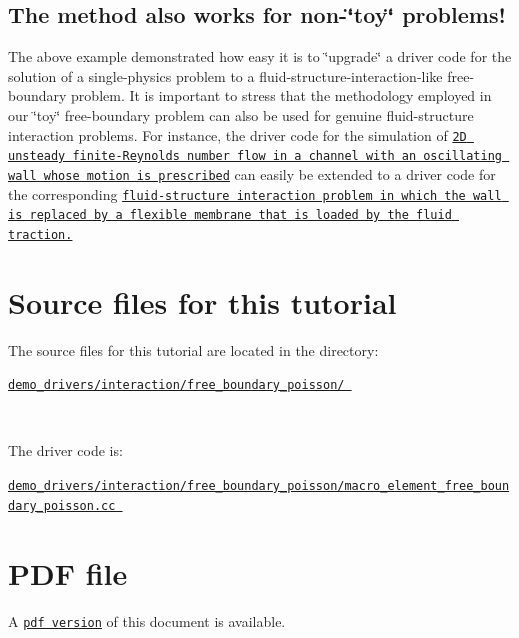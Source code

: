 \hypertarget{index_fsi}{}\subsection{The method also works for non-\/\char`\"{}toy\char`\"{} problems!}\label{index_fsi}
The above example demonstrated how easy it is to \char`\"{}upgrade\char`\"{} a driver code for the solution of a single-\/physics problem to a fluid-\/structure-\/interaction-\/like free-\/boundary problem. It is important to stress that the methodology employed in our \char`\"{}toy\char`\"{} free-\/boundary problem can also be used for genuine fluid-\/structure interaction problems. For instance, the driver code for the simulation of \href{../../../navier_stokes/collapsible_channel/html/index.html}{\tt 2D unsteady finite-\/\+Reynolds number flow in a channel with an oscillating wall whose motion is prescribed} can easily be extended to a driver code for the corresponding \href{../../../interaction/fsi_collapsible_channel/html/index.html}{\tt fluid-\/structure interaction problem in which the wall is replaced by a flexible membrane that is loaded by the fluid traction.}



 

\hypertarget{index_sources}{}\section{Source files for this tutorial}\label{index_sources}

\begin{DoxyItemize}
\item The source files for this tutorial are located in the directory\+:~\newline
~\newline
\begin{center} \href{../../../../demo_drivers/interaction/free_boundary_poisson/}{\tt demo\+\_\+drivers/interaction/free\+\_\+boundary\+\_\+poisson/ } \end{center} ~\newline

\item The driver code is\+: ~\newline
~\newline
\begin{center} \href{../../../../demo_drivers/interaction/free_boundary_poisson/macro_element_free_boundary_poisson.cc}{\tt demo\+\_\+drivers/interaction/free\+\_\+boundary\+\_\+poisson/macro\+\_\+element\+\_\+free\+\_\+boundary\+\_\+poisson.\+cc } \end{center} 
\end{DoxyItemize}

 

 \hypertarget{index_pdf}{}\section{P\+D\+F file}\label{index_pdf}
A \href{../latex/refman.pdf}{\tt pdf version} of this document is available. 
